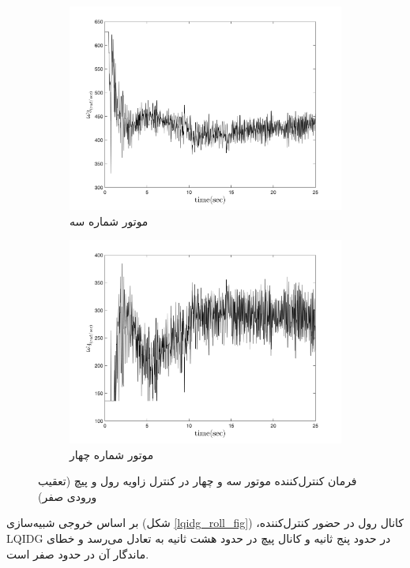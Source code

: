 \begin{figure}
	[width=12cm]
	\centering
	\begin{subfigure}
		\centering
		\includegraphics[width=12cm]{../Figures/Calibration/LQIDG/3DOF/lqidg_Omega_3.png}
		\caption{موتور شماره سه}
	\end{subfigure}
	\begin{subfigure}
		\centering
		\includegraphics[width=12cm]{../Figures/Calibration/LQIDG/3DOF/lqidg_Omega_4.png}
		\caption{موتور شماره چهار}
	\end{subfigure}
	\caption{‫‪فرمان کنترل‌کننده موتور سه و چهار در کنترل زاویه رول و پیچ (تعقیب ورودی صفر)}
\end{figure}


بر اساس خروجی شبیه‌سازی (شکل
\ref{lqidg_roll_fig})
،کانال رول در حضور کنترل‌کننده LQIDG در حدود پنج ثانیه و کانال پیچ در حدود هشت ثانیه به تعادل می‌رسد و خطای ماندگار آن در حدود صفر است.